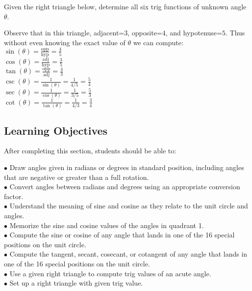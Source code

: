 \documentclass{ximera}
\begin{document}
\begin{question}
Given the right triangle below, determine all six trig functions of unknown angle $\theta$.

\begin{explanation}
Observe that in this triangle, adjacent=$3$, opposite=$4$, and hypotenuse=$5$. Thus without even knowing the exact value of $\theta$ we can compute:
\\$\sin(\theta)=\frac{\text{opp}}{\text{hyp}}=\frac{4}{5}$
\\$\cos(\theta)=\frac{\text{adj}}{\text{hyp}}=\frac{3}{5}$
\\$\tan(\theta)=\frac{\text{opp}}{\text{adj}}=\frac{4}{3}$
\\$\csc(\theta)=\frac{1}{\sin(\theta)}=\frac{1}{4/5}=\frac{5}{4}$
\\$\sec(\theta)=\frac{1}{\cos(\theta)}=\frac{1}{3/5}=\frac{5}{3}$
\\$\cot(\theta)=\frac{1}{\tan(\theta)}=\frac{1}{4/3}=\frac{3}{4}$
\end{explanation}
\end{question}


\subsection{Learning Objectives}
After completing this section, students should be able to:
\vspace{.05in}

\noindent$\bullet$ Draw angles given in radians or degrees in standard position, including angles that are negative or greater than a full rotation.
\\$\bullet$ Convert angles between radians and degrees using an appropriate conversion factor.
\\$\bullet$ Understand the meaning of sine and cosine as they relate to the unit circle and angles.
\\$\bullet$ Memorize the sine and cosine values of the angles in quadrant 1.
\\$\bullet$ Compute the sine or cosine of any angle that lands in one of the 16 special positions on the unit circle.
\\$\bullet$ Compute the tangent, secant, cosecant, or cotangent of any angle that lands in one of the 16 special positions on the unit circle.
\\$\bullet$ Use a given right triangle to compute trig values of an acute angle.
\\$\bullet$ Set up a right triangle with given trig value.
\end{document}
